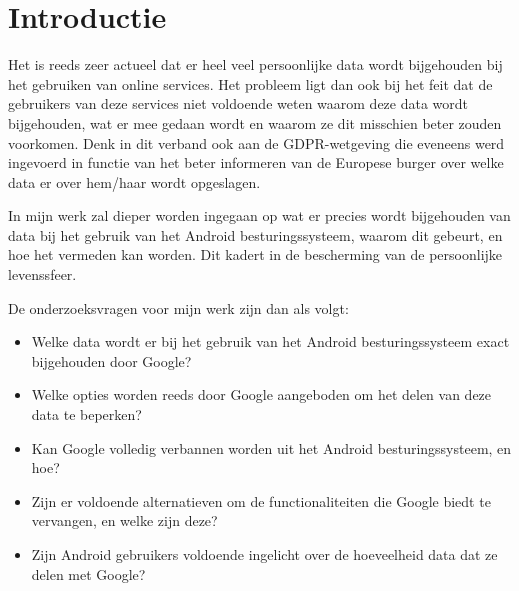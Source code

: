 
\section{Introductie} %
\label{sec:introductie}



Het is reeds zeer actueel dat er heel veel persoonlijke data wordt bijgehouden bij het gebruiken van online services. Het probleem ligt dan ook bij het feit dat de gebruikers van deze services niet voldoende weten waarom deze data wordt bijgehouden, wat er mee gedaan wordt en waarom ze dit misschien beter zouden voorkomen. Denk in dit verband ook aan de GDPR-wetgeving die eveneens werd ingevoerd in functie van het beter informeren van de Europese burger over welke data er over hem/haar wordt opgeslagen. 

\vspace{3mm}

\noindent In mijn werk zal dieper worden ingegaan op wat er precies wordt bijgehouden van data bij het gebruik van het Android besturingssysteem, waarom dit gebeurt, en hoe het vermeden kan worden. Dit kadert in de bescherming van de persoonlijke levenssfeer. 

\vspace{3mm}

\noindent De onderzoeksvragen voor mijn werk zijn dan als volgt:


\begin{itemize}
	\item Welke data wordt er bij het gebruik van het Android besturingssysteem exact bijgehouden door Google?
	\item Welke opties worden reeds door Google aangeboden om het delen van deze data te beperken?
	\item Kan Google volledig verbannen worden uit het Android besturingssysteem, en hoe?
	\item Zijn er voldoende alternatieven om de functionaliteiten die Google biedt te vervangen, en welke zijn deze?
	\item Zijn Android gebruikers voldoende ingelicht over de hoeveelheid data dat ze delen met Google?
\end{itemize}


